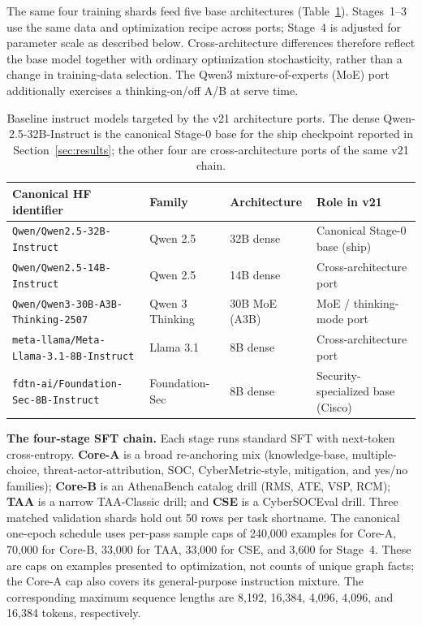 \documentclass[conference]{IEEEtran}
\providecommand{\hfid}[1]{{\small\nolinkurl{#1}}}
\begin{document}
The same four training shards feed five base architectures (Table~\ref{tab:base-models}). Stages~1--3 use the same data and optimization recipe across ports; Stage~4 is adjusted for parameter scale as described below. Cross-architecture differences therefore reflect the base model together with ordinary optimization stochasticity, rather than a change in training-data selection. The Qwen3 mixture-of-experts (MoE) port additionally exercises a thinking-on/off A/B at serve time.

\begin{table}[t]
\centering
\caption{Baseline instruct models targeted by the v21 architecture ports. The dense Qwen-2.5-32B-Instruct is the canonical Stage-0 base for the ship checkpoint reported in Section~\ref{sec:results}; the other four are cross-architecture ports of the same v21 chain.}
\label{tab:base-models}
\small
\setlength{\tabcolsep}{4pt}
\begin{tabular}{p{4.8cm} l l l}
\hline
\textbf{Canonical HF identifier} & \textbf{Family} & \textbf{Architecture} & \textbf{Role in v21} \\
\hline
\hfid{Qwen/Qwen2.5-32B-Instruct}             & Qwen 2.5             & 32B dense          & Canonical Stage-0 base (ship) \\
\hfid{Qwen/Qwen2.5-14B-Instruct}             & Qwen 2.5             & 14B dense          & Cross-architecture port \\
\hfid{Qwen/Qwen3-30B-A3B-Thinking-2507}      & Qwen 3 Thinking      & 30B MoE (A3B)      & MoE / thinking-mode port \\
\hfid{meta-llama/Meta-Llama-3.1-8B-Instruct} & Llama 3.1            & 8B dense           & Cross-architecture port \\
\hfid{fdtn-ai/Foundation-Sec-8B-Instruct}    & Foundation-Sec       & 8B dense           & Security-specialized base (Cisco) \\
\hline
\end{tabular}
\end{table}

\textbf{The four-stage SFT chain.} Each stage runs standard SFT with next-token cross-entropy. \textbf{Core-A} is a broad re-anchoring mix (knowledge-base, multiple-choice, threat-actor-attribution, SOC, CyberMetric-style, mitigation, and yes/no families); \textbf{Core-B} is an AthenaBench catalog drill (RMS, ATE, VSP, RCM); \textbf{TAA} is a narrow TAA-Classic drill; and \textbf{CSE} is a CyberSOCEval drill. Three matched validation shards hold out 50 rows per task shortname. The canonical one-epoch schedule uses per-pass sample caps of 240,000 examples for Core-A, 70,000 for Core-B, 33,000 for TAA, 33,000 for CSE, and 3,600 for Stage~4. These are caps on examples presented to optimization, not counts of unique graph facts; the Core-A cap also covers its general-purpose instruction mixture. The corresponding maximum sequence lengths are 8,192, 16,384, 4,096, 4,096, and 16,384 tokens, respectively.
\end{document}
